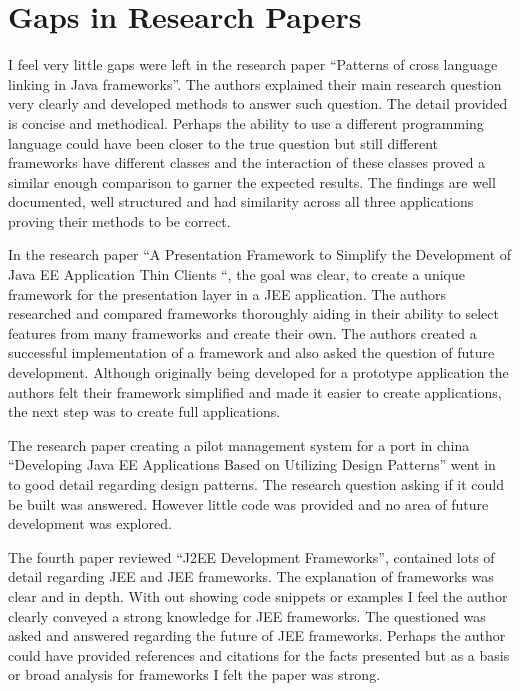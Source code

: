 \documentclass{article}
\begin{document}
\section{Gaps in Research Papers}
I feel very little gaps were left in the research paper “Patterns of cross language linking in Java frameworks”. The authors explained their main research question very clearly and developed methods to answer such question. The detail provided is concise and methodical. Perhaps the ability to use a different programming language could have been closer to the true question but still different frameworks have different classes and the interaction of these classes proved a similar enough comparison to garner the expected results. The findings are well documented, well structured and had similarity across all three applications proving their methods to be correct.

In the research paper “A Presentation Framework to Simplify the Development of Java EE Application Thin Clients “, the goal was clear, to create a unique framework for the presentation layer in a JEE application. The authors researched and compared frameworks thoroughly aiding in their ability to select features from many frameworks and create their own. The authors created a successful implementation of a framework and also asked the question of future development. Although originally being developed for a prototype application the authors felt their framework simplified and made it easier to create applications, the next step was to create full applications. 

The research paper creating a pilot management system for a port in china “Developing Java EE Applications Based on Utilizing Design Patterns” went in to good detail regarding design patterns. The research question asking if it could be built was answered. However little code was provided and no area of future development was explored.

The fourth paper reviewed “J2EE Development Frameworks”, contained lots of detail regarding JEE and JEE frameworks. The explanation of frameworks was clear and in depth. With out showing code snippets or examples I feel the author clearly conveyed a strong knowledge for JEE frameworks. The questioned was asked and answered regarding the future of JEE frameworks. Perhaps the author could have provided references and citations for the facts presented but as a basis or broad analysis for frameworks I felt the paper was strong.
\end{document}
